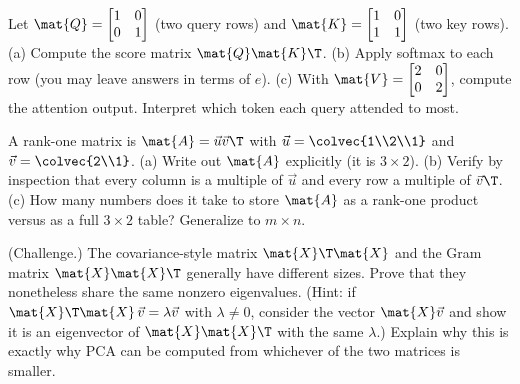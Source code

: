 \begin{exercise}
Let $\mat{Q}=\begin{bmatrix}1&0\\0&1\end{bmatrix}$ (two query rows) and
$\mat{K}=\begin{bmatrix}1&0\\1&1\end{bmatrix}$ (two key rows).
(a) Compute the score matrix $\mat{Q}\mat{K}\T$.
(b) Apply softmax to each row (you may leave answers in terms of $e$).
(c) With $\mat{V}=\begin{bmatrix}2&0\\0&2\end{bmatrix}$, compute the attention output.
Interpret which token each query attended to most.
\end{exercise}

\begin{exercise}
A rank-one matrix is $\mat{A}=\vec{u}\vec{v}\T$ with $\vec{u}=\colvec{1\\2\\1}$ and
$\vec{v}=\colvec{2\\1}$.
(a) Write out $\mat{A}$ explicitly (it is $3\times2$).
(b) Verify by inspection that every column is a multiple of $\vec{u}$ and every row a
multiple of $\vec{v}\T$.
(c) How many numbers does it take to store $\mat{A}$ as a rank-one product versus as a
full $3\times2$ table? Generalize to $m\times n$.
\end{exercise}

\begin{exercise}
(Challenge.) The covariance-style matrix $\mat{X}\T\mat{X}$ and the Gram matrix
$\mat{X}\mat{X}\T$ generally have different sizes. Prove that they nonetheless share the
same nonzero eigenvalues. (Hint: if $\mat{X}\T\mat{X}\,\vec{v}=\lambda\vec{v}$ with
$\lambda\neq0$, consider the vector $\mat{X}\vec{v}$ and show it is an eigenvector of
$\mat{X}\mat{X}\T$ with the same $\lambda$.) Explain why this is exactly why PCA can be
computed from whichever of the two matrices is smaller.
\end{exercise}
